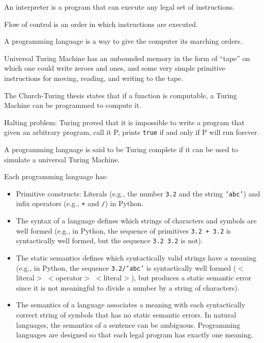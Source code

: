 \documentclass[10pt,a5paper]{article}
\begin{document}
An interpreter is a program that can execute any legal set of instructions.

Flow of control is an order in which instructions are executed.

A programming language is a way to give the computer its marching orders.

Universal Turing Machine has  an unbounded memory in the form of “tape” on which one could write zeroes and ones, and some very simple primitive instructions for moving, reading, and writing to the tape.

The Church-Turing thesis states that if a function is computable, a Turing Machine can be programmed to compute it.

Halting problem: Turing proved that it is impossible to write a program that given an arbitrary program, call it P, prints \texttt{true} if and only if P will run forever. 

A programming language is said to be Turing complete if it can be used to simulate a universal Turing Machine.

Each programming language has:
\begin{itemize}

	\item Primitive constructs: Literals (e.g., the number \texttt{3.2} and the string \texttt{'abc'}) and infix operators (e.g., \texttt{+} and \texttt{/}) in Python.
	
	\item The syntax of a language defines which strings of characters and symbols are well formed (e.g., in Python, the sequence of primitives \texttt{3.2 + 3.2} is syntactically well formed, but the sequence \texttt{3.2 3.2} is not). 
	
	\item The static semantics defines which syntactically valid strings have a meaning (e.g., in Python, the sequence \texttt{3.2/'abc'} is syntactically well formed ($<$literal$>$ $<$operator$>$ $<$literal$>$), but produces a static semantic error since it is not meaningful to divide a number by a string of
characters).

	\item The semantics of a language associates a meaning with each syntactically correct string of symbols that has no static semantic errors. In natural languages, the semantics of a sentence can be ambiguous. Programming languages are designed so that each legal program has exactly one meaning.
	
\end{itemize}
\end{document}
